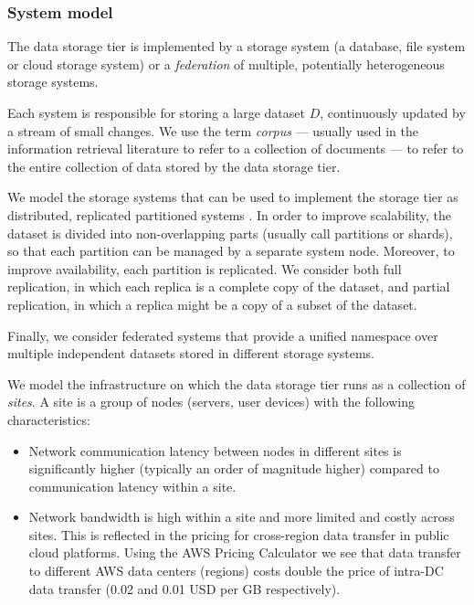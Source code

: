 \subsubsection{System model}
The data storage tier is implemented by a storage system (a database, file system or cloud storage system) or a
\textit{federation} of multiple, potentially heterogeneous storage systems.

Each system is responsible for storing a large dataset $D$, continuously updated by a stream of small changes.
We use the term \textit{corpus}  --- usually used in the information retrieval literature to refer to a collection of documents ---
to refer to the entire collection of data stored by the data storage tier.

We model the storage systems that can be used to implement the storage tier as distributed, replicated partitioned systems .
In order to improve scalability, the dataset is divided into non-overlapping parts (usually call partitions or shards),
so that each partition can be managed by a separate system node.
Moreover, to improve availability, each partition is replicated.
We consider both full replication, in which each replica is a complete copy of the dataset,
and partial replication, in which a replica might be a copy of a subset of the dataset.

Finally, we consider federated systems that provide a unified namespace over multiple independent datasets stored in different storage systems.

\medskip
\noindent
We model the infrastructure on which the data storage tier runs as a collection of \textit{sites}.
A site is a group of nodes (servers, user devices) with the following characteristics:
\begin{itemize}
  \item Network communication latency between nodes in different sites is significantly higher (typically an order of
  magnitude higher) \cite{pbailis:hats} compared to communication latency within a site.
  \item Network bandwidth is high within a site and more limited and costly across sites.
  This is reflected in the pricing for cross-region data transfer in public cloud platforms.
  Using the AWS Pricing Calculator \cite{aws:costcalc} we see that data transfer to different AWS data centers
  (regions) costs double the price of intra-DC data transfer (0.02 and 0.01 USD per GB respectively).
\end{itemize}

